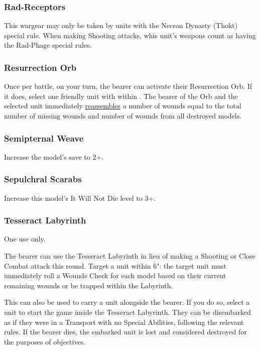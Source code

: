\subsubsection{Rad-Receptors} \label{Rad Receptors}

This wargear may only be taken by units with the Necron Dynasty (Thokt) special rule. When making Shooting attacks, whis unit's weapons count as having the Rad-Phage special rules.

\subsubsection{Resurrection Orb} \label{Resurrection Orb}

Once per battle, on your turn, the bearer can activate their Resurrection Orb. If it does, select one friendly unit with  within . The bearer of the Orb and the selected unit immediately \textcolor{violet}{\hyperref[Reanimation Protocols]{reassembles}} a number of wounds equal to the total number of missing wounds and number of wounds from all destroyed models.

\subsubsection{Semipternal Weave} \label{Sempiternal Weave}

Increase the model's save to 2+.

\subsubsection{Sepulchral Scarabs} \label{Sepulchral Scarabs}

Increase this model's It Will Not Die level to 3+.

\subsubsection{Tesseract Labyrinth} \label{Tesseract Labyrinth}

One use only.

The bearer can use the Tesseract Labyrinth in lieu of making a Shooting or Close Combat attack this round. Target a unit within 6": the target unit must immediately roll a Wounds Check for each model based on their current remaining wounds or be trapped within the Labyrinth.

This can also be used to carry a unit alongside the bearer. If you do so, select a unit to start the game inside the Tesseract Labyrinth. They can be disembarked as if they were in a Transport with no Special Abilities, following the relevant rules. If the bearer dies, the embarked unit is lost and considered destroyed for the purposes of objectives.

